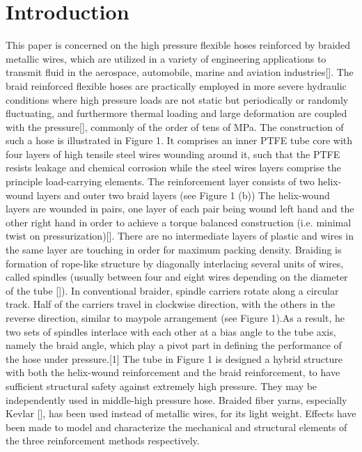 \section{Introduction}
\label{introduction}




This paper is concerned on the high pressure flexible hoses reinforced by braided metallic wires, which are utilized in a variety of engineering applications to transmit fluid in the aerospace, automobile, marine and aviation industries[]. The braid reinforced flexible hoses are practically employed in more severe hydraulic conditions where high pressure loads are not static but periodically or randomly fluctuating, and furthermore thermal loading and large deformation are coupled with the pressure[], commonly of the order of tens of MPa. 
The construction of such a hose is illustrated in Figure 1. It comprises an inner PTFE tube core with four layers of high tensile steel wires wounding around it, such that the PTFE resists leakage and chemical corrosion while the steel wires layers comprise the principle load-carrying elements. The reinforcement layer consists of two helix-wound layers and outer two braid layers (see Figure 1 (b))
The helix-wound layers are wounded in pairs, one layer of each pair being wound left hand and the other right hand in order to achieve a torque balanced construction (i.e. minimal twist on pressurization)[]. There are no intermediate layers of plastic and wires in the same layer are touching in order for maximum packing density.
Braiding is formation of rope-like structure by diagonally interlacing several units of wires, called spindles (usually between four and eight wires depending on the diameter of the tube []). 
In conventional braider, spindle carriers rotate along a circular track. Half of the carriers travel in clockwise direction, with the others in the reverse direction, similar to maypole arrangement (see Figure 1).As a result, he two sets of spindles interlace with each other at a bias angle to the tube axis, namely the braid angle, which play a pivot part in defining the performance of the hose under pressure.[1]
The tube in Figure 1 is designed a hybrid structure with both the helix-wound reinforcement and the braid reinforcement, to have sufficient structural safety against extremely high pressure. They may be independently used in middle-high pressure hose. Braided fiber yarns, especially Kevlar [], has been used instead of metallic wires, for its light weight. Effects have been made to model and characterize the mechanical and structural elements of the three reinforcement methods respectively.



